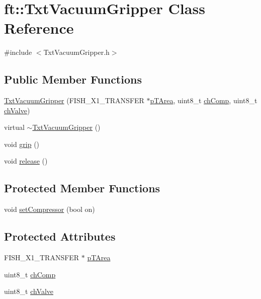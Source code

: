 \hypertarget{classft_1_1_txt_vacuum_gripper}{}\section{ft\+:\+:Txt\+Vacuum\+Gripper Class Reference}
\label{classft_1_1_txt_vacuum_gripper}


{\ttfamily \#include $<$Txt\+Vacuum\+Gripper.\+h$>$}

\subsection*{Public Member Functions}
\begin{DoxyCompactItemize}
\item 
\hyperlink{classft_1_1_txt_vacuum_gripper_a72e487f718ccf9fda0f77784bb0b800f}{Txt\+Vacuum\+Gripper} (F\+I\+S\+H\+\_\+\+X1\+\_\+\+T\+R\+A\+N\+S\+F\+ER $\ast$\hyperlink{classft_1_1_txt_vacuum_gripper_ae5573d32320fc86aa2c70ebd1fef03ff}{p\+T\+Area}, uint8\+\_\+t \hyperlink{classft_1_1_txt_vacuum_gripper_a28c6fcf1bb14dd5d00a9578f291c9fc4}{ch\+Comp}, uint8\+\_\+t \hyperlink{classft_1_1_txt_vacuum_gripper_aa0e9e057c407c46b273a39add7b63200}{ch\+Valve})
\item 
virtual \hyperlink{classft_1_1_txt_vacuum_gripper_afcb3f74dfe7d134af046168f0d462e99}{$\sim$\+Txt\+Vacuum\+Gripper} ()
\item 
void \hyperlink{classft_1_1_txt_vacuum_gripper_a66375637d1e20bc57ed28877eab82cbf}{grip} ()
\item 
void \hyperlink{classft_1_1_txt_vacuum_gripper_af5500d27dddf8987aa7041a8c1b3481a}{release} ()
\end{DoxyCompactItemize}
\subsection*{Protected Member Functions}
\begin{DoxyCompactItemize}
\item 
void \hyperlink{classft_1_1_txt_vacuum_gripper_a6b939a2ae67e997c24f19e583e28fa19}{set\+Compressor} (bool on)
\end{DoxyCompactItemize}
\subsection*{Protected Attributes}
\begin{DoxyCompactItemize}
\item 
F\+I\+S\+H\+\_\+\+X1\+\_\+\+T\+R\+A\+N\+S\+F\+ER $\ast$ \hyperlink{classft_1_1_txt_vacuum_gripper_ae5573d32320fc86aa2c70ebd1fef03ff}{p\+T\+Area}
\item 
uint8\+\_\+t \hyperlink{classft_1_1_txt_vacuum_gripper_a28c6fcf1bb14dd5d00a9578f291c9fc4}{ch\+Comp}
\item 
uint8\+\_\+t \hyperlink{classft_1_1_txt_vacuum_gripper_aa0e9e057c407c46b273a39add7b63200}{ch\+Valve}
\end{DoxyCompactItemize}


